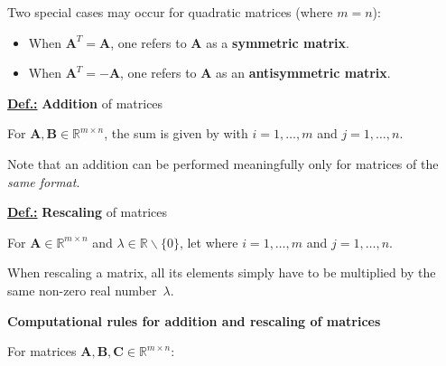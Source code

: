 \medskip
\noindent
Two special cases may occur for quadratic matrices (where $m=n$):
%
\begin{itemize}
	\item When $\mathbf{A}^{T}=\mathbf{A}$, one refers to 
	$\mathbf{A}$ as a {\bf symmetric matrix}.
	\item When $\mathbf{A}^{T}=-\mathbf{A}$, one refers to 
	$\mathbf{A}$ as an {\bf antisymmetric matrix}.
\end{itemize}
%

\medskip
\noindent
\underline{\bf Def.:}
{\bf Addition} of matrices

\noindent
For $\mathbf{A}, \mathbf{B} \in \mathbb{R}^{m \times n}$, the sum 
is given by
%
\be
{}
\ee
%
with $i=1,\ldots,m$ and $j=1,\ldots,n$.

\medskip
\noindent
Note that an addition can be performed meaningfully only for 
matrices of the \emph{same format}.

\pagebreak
\medskip
\noindent
\underline{\bf Def.:}
{\bf Rescaling} of matrices

\noindent
For $\mathbf{A} \in \mathbb{R}^{m \times n}$
and $\lambda \in \mathbb{R}\backslash \{0\}$, let
%
\be
{}
\ee
%
where $i=1,\ldots,m$ and $j=1,\ldots,n$.

\medskip
\noindent
When rescaling a matrix, all its elements simply have to be 
multiplied by the same non-zero real number~$\lambda$.

\medskip
\noindent
{\bf Computational rules for addition and rescaling of matrices}

\noindent
For matrices $\mathbf{A}, \mathbf{B}, \mathbf{C}
\in \mathbb{R}^{m \times n}$:

